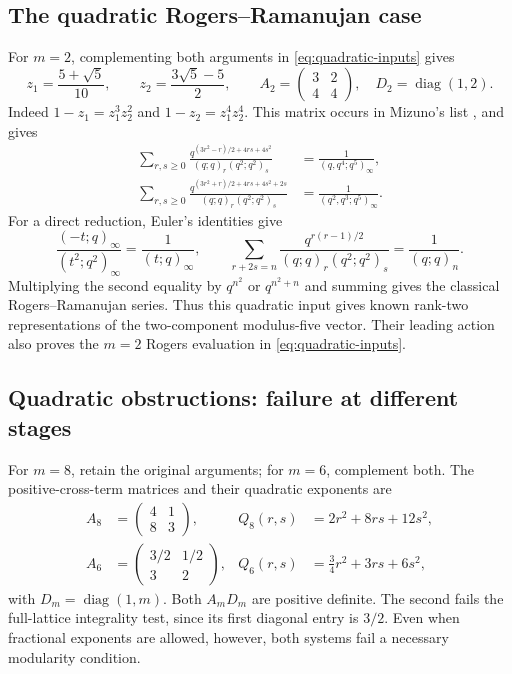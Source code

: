 \documentclass[11pt,reqno]{amsart}
\theoremstyle{remark}
\numberwithin{equation}{section}
\begin{document}
\subsection{The quadratic Rogers--Ramanujan case}
For $m=2$, complementing both arguments in
\eqref{eq:quadratic-inputs} gives
\[
 z_1=\frac{5+\sqrt5}{10},\qquad z_2=\frac{3\sqrt5-5}{2},\qquad
 A_2=\begin{pmatrix}3&2\\4&4\end{pmatrix},\quad D_2=\operatorname{diag}(1,2).
\]
Indeed $1-z_1=z_1^3z_2^2$ and $1-z_2=z_1^4z_2^4$. This matrix
occurs in Mizuno's list \cite[(49)]{Mizuno}, and gives
\begin{align}
 \sum_{r,s\geq0}\frac{q^{(3r^2-r)/2+4rs+4s^2}}
 {(q;q)_r(q^2;q^2)_s}
 &=\frac1{(q,q^4;q^5)_\infty},\label{eq:quadRR1}\\
 \sum_{r,s\geq0}\frac{q^{(3r^2+r)/2+4rs+4s^2+2s}}
 {(q;q)_r(q^2;q^2)_s}
 &=\frac1{(q^2,q^3;q^5)_\infty}.\label{eq:quadRR2}
\end{align}
For a direct reduction, Euler's identities give
\[
 \frac{(-t;q)_\infty}{(t^2;q^2)_\infty}=\frac1{(t;q)_\infty},\qquad
 \sum_{r+2s=n}\frac{q^{r(r-1)/2}}{(q;q)_r(q^2;q^2)_s}
 =\frac1{(q;q)_n}.
\]
Multiplying the second equality by $q^{n^2}$ or $q^{n^2+n}$ and
summing gives the classical Rogers--Ramanujan series. Thus this
quadratic input gives known rank-two representations of the
two-component modulus-five vector. Their leading action also proves
the $m=2$ Rogers evaluation in \eqref{eq:quadratic-inputs}.

\subsection{Quadratic obstructions: failure at different stages}
\label{sec:quadratic-obstructions}
For $m=8$, retain the original arguments; for $m=6$, complement both.
The positive-cross-term matrices and their quadratic exponents are
\begin{align}
 A_8&=\begin{pmatrix}4&1\\8&3\end{pmatrix},&
 Q_8(r,s)&=2r^2+8rs+12s^2,\label{eq:quadA8}\\
 A_6&=\begin{pmatrix}3/2&1/2\\3&2\end{pmatrix},&
 Q_6(r,s)&=\tfrac34r^2+3rs+6s^2,\label{eq:quadA6}
\end{align}
with $D_m=\operatorname{diag}(1,m)$. Both $A_mD_m$ are positive
definite. The second fails the full-lattice integrality test, since its
first diagonal entry is $3/2$. Even when fractional exponents are
allowed, however, both systems fail a necessary modularity condition.
\end{document}
